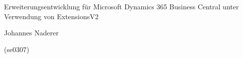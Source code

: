 \documentclass[bachelor,german]{hgbthesis}
\begin{document}

\begin{center}
	\begin{Huge}
	Erweiterungsentwicklung für Microsoft Dynamics 365 Business Central unter Verwendung von ExtensionsV2
	\end{Huge}

	\begin{Large}
	\bigbreak
	Johannes Naderer
	
	(se0307)
	\end{Large}	
\end{center}
\begin{center}
	
\end{center}
\frontmatter                    %

\tableofcontents

\mainmatter          %









\MakeBibliography                        %

\end{document}
